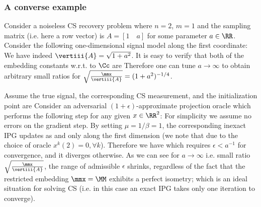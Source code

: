 \subsubsection*{A converse example}
Consider a noiseless CS recovery problem where $n =2$, $m=1$ and the sampling matrix (i.e. here a row vector) is 
$A=[1\quad a]$ 
for some parameter $a\in \RR$. Consider the following one-dimensional signal model along the first coordinate:
We have indeed $\vertiii{A}=\sqrt{1+a^2}$. It is easy to verify that both of the embedding constants w.r.t. to $\Cc$ are
Therefore one can tune $a\rightarrow \infty$ to obtain arbitrary small ratios for $\sqrt{\frac{\mmx}{\vertiii{A}}}={(1+a^2)^{-1/4}}$. 

Assume the true signal, the corresponding CS measurement,  and the initialization point are
Consider an adversarial $(1+\epsilon)$-approximate projection oracle which performs the following step for any given $x\in \RR^2$: 
For simplicity we assume no errors on the gradient step. 	
By setting $\mu=1/\beta=1$, the corresponding inexact IPG updates as 
and only along the first dimension (we note that due to the choice of oracle $x^k(2)=0, \forall k$). Therefore we have
which requires $\epsilon<a^{-1}$ for convergence, and it diverges otherwise. As we can see for $a\rightarrow \infty$  %
i.e. small ratio $\sqrt{\frac{\mmx}{\vertiii{A}}}$, 
the range of admissible $\epsilon$ shrinks, regardless of the fact that the restricted embedding $\mmx=\MM$ exhibits a  perfect isometry; which is an ideal situation for solving CS (i.e. in this case an exact IPG takes only one iteration to converge).